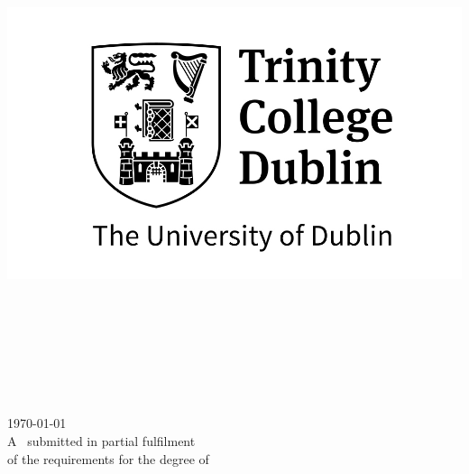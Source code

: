 \begin{titlepage}

\center
\includegraphics{title/logo_bw.jpg}\\[1cm] 
\Large \school\\[1.5cm]
\ifdefined\department
\large \department\\[1.5cm]
\fi

\makeatletter
{ \huge \bfseries \thesistitle}\\[1.5cm]
    
\ifdefined\authorid
\authorname\\
\authorid\\[2cm]
\else
\authorname\\[2cm]
\fi

{\large \today}\\[2cm]
    
\vfill
    A \typeofthesis\ submitted in partial fulfilment\\of the requirements for the degree of\\
\degree

\vfill

\end{titlepage}
